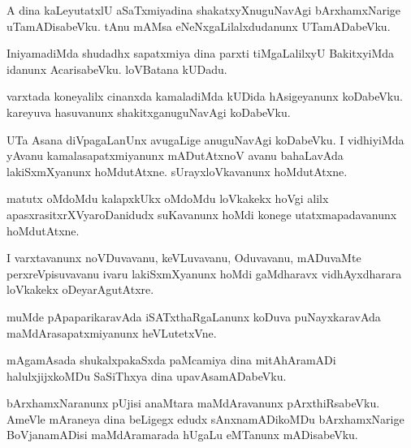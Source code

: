 \documentclass{article}
\begin{document}
\begin{mn}
A  dina  kaLeyutatxlU  aSaTxmiyadina  shakatxyXnuguNavAgi  bArxhamxNarige  
uTamADisabeVku.  tAnu  mAMsa  eNeNxgaLilalxdudanunx  UTamADabeVku.
\end{mn}

\begin{mn}
IniyamadiMda  shudadhx  sapatxmiya  dina  parxti  tiMgaLalilxyU  BakitxyiMda  
idanunx  AcarisabeVku.  loVBatana  kUDadu.
\end{mn}

\begin{mn}
varxtada  koneyalilx  cinanxda  kamaladiMda  kUDida  hAsigeyanunx  koDabeVku.  
kareyuva  hasuvanunx  shakitxganuguNavAgi  koDabeVku.
\end{mn}

\begin{mn}
UTa  Asana  diVpagaLanUnx  avugaLige  anuguNavAgi  koDabeVku.  I  vidhiyiMda  
yAvanu  kamalasapatxmiyanunx  mADutAtxnoV  avanu  bahaLavAda  lakiSxmXyanunx  
hoMdutAtxne.  sUrayxloVkavanunx  hoMdutAtxne.
\end{mn}

\begin{mn}
matutx  oMdoMdu  kalapxkUkx  oMdoMdu  loVkakekx  hoVgi  alilx  apasxrasitxrXVyaroDanidudx  
suKavanunx  hoMdi  konege  utatxmapadavanunx  hoMdutAtxne.
\end{mn}

\begin{mn}
I  varxtavanunx  noVDuvavanu,  keVLuvavanu,  Oduvavanu,  mADuvaMte  perxreVpisuvavanu  
ivaru  lakiSxmXyanunx  hoMdi  gaMdharavx  vidhAyxdharara  loVkakekx  oDeyarAgutAtxre.
\end{mn}

\begin{mn}
muMde  pApaparikaravAda  iSATxthaRgaLanunx  koDuva  puNayxkaravAda  maMdArasapatxmiyanunx  heVLutetxVne. 
\end{mn}

\begin{mn}
mAgamAsada  shukalxpakaSxda  paMcamiya  dina  mitAhAramADi  halulxjijxkoMDu  SaSiThxya  dina  upavAsamADabeVku.
\end{mn}

\begin{mn}
bArxhamxNaranunx  pUjisi  anaMtara  maMdAravanunx  pArxthiRsabeVku.  AmeVle  mAraneya  
dina  beLigegx  edudx  sAnxnamADikoMDu  bArxhamxNarige  BoVjanamADisi  maMdAramarada  
hUgaLu  eMTanunx  mADisabeVku.
\end{mn}
\end{document}
